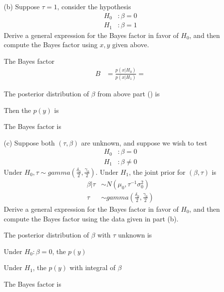 \begin{itemize}
\begin{itemize}
\end{itemize}
\item[(b)] Suppose $\tau = 1$, consider the hypothesis 
\begin{align*}
H_0 &:  \beta = 0 \\
H_1 &: \beta = 1
\end{align*}
Derive a general expression for the Bayes factor in favor of $H_0$, and then compute the Bayes factor using $x, y$ given above.

The Bayes factor 
\begin{align*}
 B &=  \frac{p(x| {H_0})}{p(x| {H_1})} = 
\end{align*}
 
 The posterior distribution of $\beta$ from above part () is 
 
 Then the $p(y)$ is 
 
 The Bayes factor is
 
 
 
  \item[(c)] Suppose both $(\tau, \beta)$ are unknown, and suppose we wish to test 
  \begin{align*}
 H_0 &:  \beta = 0 \\
 H_1 &: \beta \neq 0
\end{align*}
Under $H_0, \tau \sim gamma(\frac{\delta_0}{2}, \frac{\gamma_0}{2})$. Under $H_1$, the joint prior for $(\beta, \tau)$ is 
   \begin{align*}
 \beta | \tau & \sim N(\mu_0, \tau^{-1} \sigma_0^2)\\
 \tau &\sim gamma(\frac{\delta_0}{2}, \frac{\gamma_0}{2})
\end{align*}
Derive a general expression for the Bayes factor in favor of $H_0$, and then compute the Bayes factor using the data given in part (b).

 The posterior distribution of $\beta$ with $\tau$ unknown is
 
 
 Under $H_0: \beta = 0$, the $p(y)$ 
  
Under $H_1$, the $p(y)$ with integral of $\beta$
 
 The Bayes factor is
 
 

\end{itemize}

